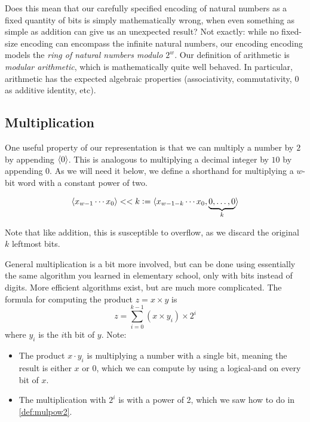 Does this mean that our carefully specified encoding of natural
numbers as a fixed quantity of bits is simply mathematically wrong,
when even something as simple as addition can give us an unexpected
result?  Not exactly: while no fixed-size encoding can encompass the
infinite natural numbers, our encoding encoding models the \emph{ring
  of natural numbers modulo $2^{w}$}.  Our definition of arithmetic is
\emph{modular arithmetic}, which is mathematically quite well behaved.
In particular, arithmetic has the expected algebraic properties
(associativity, commutativity, $0$ as additive identity, etc).

\subsection{Multiplication}
\label{sec:bit-multiplication}

One useful property of our representation is that we can multiply a
number by $2$ by appending $\langle 0 \rangle$.  This is analogous to
multiplying a decimal integer by $10$ by appending $0$.  As we will
need it below, we define a shorthand for multiplying a $w$-bit word
with a constant power of two.
\begin{definition}
  \begin{align*}
  \langle x_{w-1}\cdots{}x_{0} \rangle << k \vcentcolon=
  \langle x_{w-1-k}\cdots{}x_{0},\underbrace{0,\ldots,0}_{k} \rangle
  \end{align*}
  \label{def:mulpow2}
\end{definition}
Note that like addition, this is susceptible to overflow, as we
discard the original $k$ leftmost bits.

General multiplication is a bit more involved, but can be done using
essentially the same algorithm you learned in elementary school, only
with bits instead of digits.  More efficient algorithms exist, but are
much more complicated.  The formula for computing the product
$z=x\times{}y$ is
\begin{equation}
  z = \sum_{i=0}^{k-1} (x \times y_{i}) \times 2^{i}
\end{equation}
where $y_{i}$ is the $i$th bit of $y$.  Note:
\begin{itemize}
\item The product $x \cdot y_{i}$ is multiplying a number with a
  single bit, meaning the result is either $x$ or $0$, which we can
  compute by using a logical-and on every bit of $x$.
\item The multiplication with $2^{i}$ is with a power of 2, which we
  saw how to do in \cref{def:mulpow2}.
\end{itemize}

